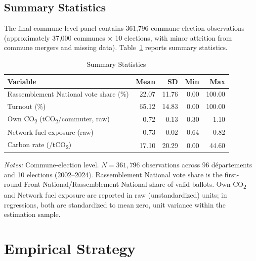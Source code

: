 \documentclass[12pt]{article}
\providecommand{\euro}{\texteuro}
\newcommand{\rn}{Rassemblement National}
\newcommand{\fn}{Front National}
\newcommand{\depts}{d\'{e}partements}
\begin{document}
\subsection{Summary Statistics}

The final commune-level panel contains 361,796 commune-election observations (approximately 37,000 communes $\times$ 10 elections, with minor attrition from commune mergers and missing data). Table~\ref{tab:summary} reports summary statistics.

\begin{table}[H]
\centering
\caption{Summary Statistics}
\label{tab:summary}
\begin{threeparttable}
\begin{tabular}{@{}lrrrr@{}}
\toprule
Variable & Mean & SD & Min & Max \\
\midrule
\rn{} vote share (\%) & 22.07 & 11.76 & 0.00 & 100.00 \\
Turnout (\%) & 65.12 & 14.83 & 0.00 & 100.00 \\
Own CO\textsubscript{2} (tCO\textsubscript{2}/commuter, raw) & 0.72 & 0.13 & 0.30 & 1.10 \\
Network fuel exposure (raw) & 0.73 & 0.02 & 0.64 & 0.82 \\
Carbon rate (\euro/tCO\textsubscript{2}) & 17.10 & 20.29 & 0.00 & 44.60 \\
\bottomrule
\end{tabular}
\begin{tablenotes}
\small
\item \textit{Notes:} Commune-election level. $N = 361{,}796$ observations across 96 \depts{} and 10 elections (2002--2024). \rn{} vote share is the first-round \fn{}/\rn{} share of valid ballots. Own CO\textsubscript{2} and Network fuel exposure are reported in raw (unstandardized) units; in regressions, both are standardized to mean zero, unit variance within the estimation sample.
\end{tablenotes}
\end{threeparttable}
\end{table}



\section{Empirical Strategy}
\label{sec:strategy}
\end{document}
